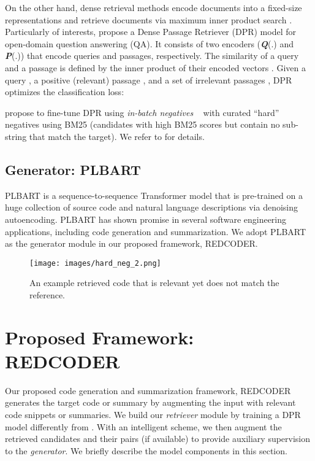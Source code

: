 \documentclass[11pt]{article}
\newcommand{\tool}{{REDCODER}\xspace}
\begin{document}
On the other hand, dense retrieval methods encode documents into a fixed-size representations and retrieve documents via maximum inner product search \cite{NIPS2014_a14ac55a, guo2016quantization}. 
Particularly of interests, \citet{karpukhin-etal-2020-dense} propose a Dense Passage Retriever (DPR) model for open-domain question answering (QA). 
It consists of two encoders (\textbf{\it Q}(.) and \textbf{\it P}(.)) that encode queries and passages, respectively. 
The similarity of a query  and a passage  is defined by the inner product of their encoded vectors .
Given a query , a positive (relevant) passage , and a set of  irrelevant passages , DPR optimizes the classification loss: 



\citet{karpukhin-etal-2020-dense} propose to fine-tune DPR using \emph{in-batch negatives} ~\cite{gillick-etal-2019-learning, yih2011learning} with curated ``hard'' negatives using BM25 (candidates with high BM25 scores but contain no sub-string  that match the target). 
We refer to \citet{karpukhin-etal-2020-dense} for  details.





\subsection{Generator: PLBART }
\label{sec:background-plbart}





PLBART \cite{ahmad2021unified} is a sequence-to-sequence Transformer model \cite{vaswani2017attention} that is pre-trained on a huge collection of source code and natural language descriptions via denoising autoencoding.
PLBART has shown promise in several software engineering applications, including code generation and summarization. We adopt PLBART as the generator module in our proposed framework, \tool.




%
 \begin{figure}[!t]
\captionsetup[subfigure]{labelformat=empty}
\centering
\texttt{[image: images/hard\_neg\_2.png]}
\caption{An example  retrieved code that is relevant yet does not match the reference.}
\vspace{-2mm}
\label{figure:targetvsret}
\end{figure}


\section{Proposed Framework: \tool}
\label{sec:method}
Our proposed code generation and summarization framework, \tool
generates the target code or summary by augmenting the input  with relevant code snippets or summaries. We build our {\em retriever} module by training a DPR model differently from \cite{karpukhin-etal-2020-dense}. With an intelligent scheme, we then augment the retrieved candidates and their pairs (if available) to  provide auxiliary supervision to the {\em generator}.  
We briefly describe the model components in this section.
\end{document}

